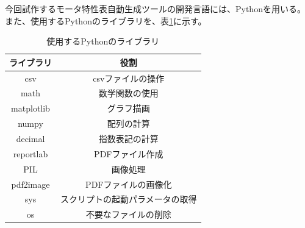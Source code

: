 今回試作するモータ特性表自動生成ツールの開発言語には、Pythonを用いる。
また、使用するPythonのライブラリを、表\ref{tab:libr}に示す。
\begin{table}[t]
	\centering
	\caption{使用するPythonのライブラリ}
	\begin{tabular}{|c|c|} \hline
	  ライブラリ & 役割\\ \hline \hline
	  csv & csvファイルの操作 \\ \hline
	  math &  数学関数の使用\\ \hline
	  matplotlib & グラフ描画\\ \hline
	  numpy &  配列の計算\\ \hline
	  decimal &  指数表記の計算\\ \hline
	  reportlab & PDFファイル作成 \\ \hline
	  PIL &  画像処理\\ \hline
	  pdf2image &  PDFファイルの画像化\\ \hline
	  sys & スクリプトの起動パラメータの取得\\ \hline
	  os &  不要なファイルの削除\\ \hline
	\end{tabular}
	\label{tab:libr}
  \end{table}



